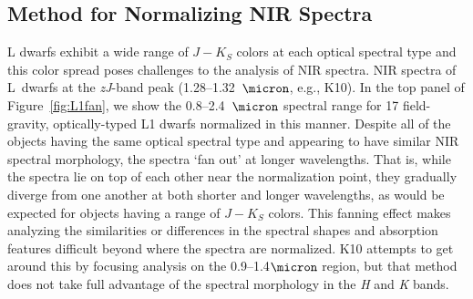 \documentclass[modern,trackchanges]{aastex61}
\begin{document}
\subsection{Method for Normalizing NIR Spectra}
\label{sec:method}
L dwarfs exhibit a wide range of $J-K_S$ colors at each optical spectral type \cite[e.g.,][]{Kirkpatrick08, Schmidt10, Faherty:2012cy} and this color spread poses challenges to the analysis of NIR spectra.
 NIR spectra of L~dwarfs at the \emph{zJ}-band peak (1.28--1.32~$\micron$, e.g., K10). %
In the top panel of Figure~\ref{fig:L1fan}, we show the 0.8--2.4~$\micron$ spectral range for 17 field-gravity, optically-typed L1 dwarfs normalized in this manner.
Despite all of the objects having the same optical spectral type and appearing to have similar NIR spectral morphology, the spectra `fan out' at longer wavelengths.
That is, while the spectra lie on top of each other near the normalization point, they gradually diverge from one another at both shorter and longer wavelengths, as would be expected for objects having a range of $J-K_S$ colors.
This fanning effect makes analyzing the similarities or differences in the spectral shapes and absorption features difficult beyond where the spectra are normalized.
K10 attempts to get around this by focusing analysis on the 0.9--1.4$\micron$ region, but that method does not take full advantage of the spectral morphology in the \emph{H} and \emph{K} bands.
\end{document}
